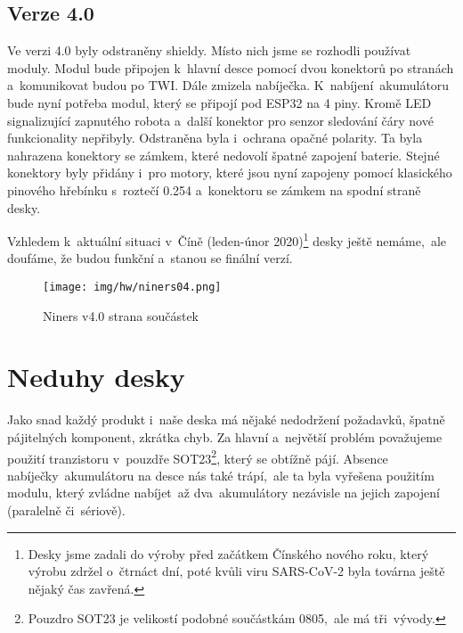 \subsection{Verze 4.0}
Ve verzi 4.0 byly odstraněny shieldy. Místo nich jsme se rozhodli používat moduly. Modul bude připojen k~hlavní desce pomocí dvou konektorů po stranách a~komunikovat budou po TWI. Dále zmizela nabíječka. K~nabíjení~akumulátoru bude nyní potřeba modul, který se připojí pod ESP32 na 4 piny. Kromě LED signalizující zapnutého robota a~další konektor pro senzor sledování čáry nové funkcionality nepřibyly. Odstraněna byla i~ochrana opačné polarity. Ta byla nahrazena konektory se zámkem, které nedovolí špatné zapojení baterie. Stejné konektory byly přidány i~pro motory, které jsou nyní zapojeny pomocí klasického pinového hřebínku s~roztečí 0.254 a~konektoru se zámkem na spodní straně desky.

Vzhledem k~aktuální situaci v~Číně (leden-únor 2020)\footnote{Desky jsme zadali do výroby před začátkem Čínského nového roku, který výrobu zdržel o~čtrnáct dní, poté kvůli viru SARS-CoV-2 byla továrna ještě nějaký čas zavřená.} desky ještě nemáme,~ale doufáme, že budou funkční a~stanou se finální verzí.

\begin{figure}[H]
    \centering
    \texttt{[image: img/hw/niners04.png]}
    \caption{Niners v4.0 strana součástek}
  \end{figure}
 

\section{Neduhy desky}
Jako snad každý produkt i~naše deska má nějaké nedodržení požadavků, špatně pájitelných komponent, zkrátka chyb. Za hlavní a~největší problém považujeme použití tranzistoru v~pouzdře SOT23\footnote{Pouzdro SOT23 je velikostí podobné součástkám 0805,~ale má tři~vývody.}, který se obtížně pájí. Absence nabíječky~akumulátoru na desce nás také trápí,~ale ta byla vyřešena použitím modulu, který zvládne nabíjet~až dva~akumulátory nezávisle na jejich zapojení (paralelně či~sériově).